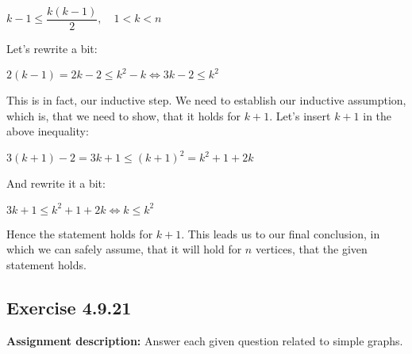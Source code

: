 \documentclass{report}
\newcommand{\cent}[1]{\begin{center}#1\end{center}}
\newcommand{\AssignmentDescription}{\textbf{Assignment description: }}
\newcommand{\Exercise}[1]{\subsection{Exercise #1}}
\begin{document}
	\cent{$k-1 \leq \dfrac{k(k-1)}{2}, \quad 1 < k < n$}
	
	Let's rewrite a bit:
	
	\cent{$2(k-1) = 2k-2 \leq k^2 - k \Leftrightarrow 3k-2 \leq k^2$}
	
	This is in fact, our inductive step. We need to establish our inductive assumption, which is, that we need to show, that it holds for $k+1$. Let's insert $k+1$ in the above inequality:
	
	\cent{$3(k+1)-2 = 3k+1 \leq (k+1)^2 = k^2 + 1 + 2k$}
	
	And rewrite it a bit:
	
	\cent{$3k+1 \leq  k^2 + 1 + 2k \Leftrightarrow k \leq k^2$}
	
	Hence the statement holds for $k+1$. This leads us to our final conclusion, in which we can safely assume, that it will hold for $n$ vertices, that the given statement holds.
	
	\Exercise{4.9.21}
	
	\AssignmentDescription
	Answer each given question related to simple graphs.
	
\end{document}
